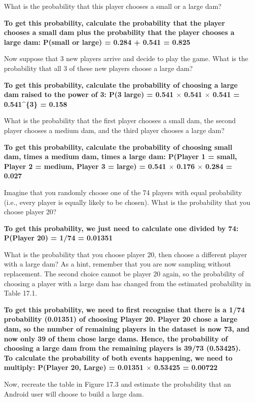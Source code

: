\documentclass[
  openany]{krantz}
\begin{document}
What is the probability that this player chooses a small or a large dam?

\textbf{To get this probability, calculate the probability that the player chooses a small dam plus the probability that the player chooses a large dam: P(small or large) = 0.284 + 0.541 = 0.825}

Now suppose that 3 new players arrive and decide to play the game. What is the probability that all 3 of these new players choose a large dam?

\textbf{To get this probability, calculate the probability of choosing a large dam raised to the power of 3: P(3 large) = 0.541 \(\times\) 0.541 \(\times\) 0.541 = 0.541\^{}\{3\} = 0.158}

What is the probability that the first player chooses a small dam, the second player chooses a medium dam, and the third player chooses a large dam?

\textbf{To get this probability, calculate the probability of choosing small dam, times a medium dam, times a large dam: P(Player 1 = small, Player 2 = medium, Player 3 = large) = 0.541 \(\times\) 0.176 \(\times\) 0.284 = 0.027}

Imagine that you randomly choose one of the 74 players with equal probability (i.e., every player is equally likely to be chosen). What is the probability that you choose player 20?

\textbf{To get this probability, we just need to calculate one divided by 74: P(Player 20) = 1/74 = 0.01351}

What is the probability that you choose player 20, then choose a different player with a large dam? As a hint, remember that you are now sampling without replacement. The second choice cannot be player 20 again, so the probability of choosing a player with a large dam has changed from the estimated probability in Table 17.1.

\textbf{To get this probability, we need to first recognise that there is a 1/74 probability (0.01351) of choosing Player 20. Player 20 chose a large dam, so the number of remaining players in the dataset is now 73, and now only 39 of them chose large dams. Hence, the probability of choosing a large dam from the remaining players is 39/73 (0.53425). To calculate the probability of both events happening, we need to multiply: P(Player 20, Large) = 0.01351 \(\times\) 0.53425 = 0.00722}

Now, recreate the table in Figure 17.3 and estimate the probability that an Android user will choose to build a large dam.
\end{document}
